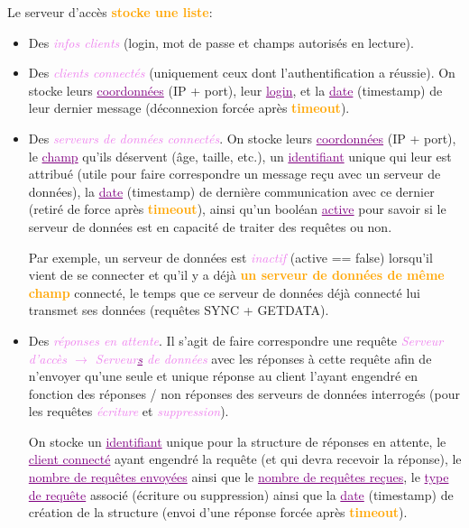 \documentclass[a4paper]{article}
\newcommand{\ra}{\rightarrow}
\let\oldtextbf\textbf
\renewcommand{\textbf}[1]{\textcolor{orange}{\oldtextbf{#1}}}
\let\oldunderline\underline{}
\renewcommand{\underline}[1]{\textcolor{purple}{\oldunderline{#1}}}
\let\oldtextit\textit
\renewcommand{\textit}[1]{\textcolor{violet}{\oldtextit{#1}}}
\begin{document}
Le serveur d'accès \textbf{stocke une liste}:
\begin{itemize}
    \item Des \textit{infos clients} (login, mot de passe et champs autorisés en lecture).

    \item Des \textit{clients connectés} (uniquement ceux dont l'authentification a réussie). On stocke leurs \underline{coordonnées} (IP + port), leur \underline{login}, et la \underline{date} (timestamp) de leur dernier message (déconnexion forcée après \textbf{timeout}).

    \item Des \textit{serveurs de données connectés}. On stocke leurs \underline{coordonnées} (IP + port), le \underline{champ} qu'ils déservent (âge, taille, etc.), un \underline{identifiant} unique qui leur est attribué (utile pour faire correspondre un message reçu avec un serveur de données), la \underline{date} (timestamp) de dernière communication avec ce dernier (retiré de force après \textbf{timeout}), ainsi qu'un booléan \underline{active} pour savoir si le serveur de données est en capacité de traiter des requêtes ou non.

    Par exemple, un serveur de données est \textit{inactif} (active == false) lorsqu'il vient de se connecter et qu'il y a déjà \textbf{un serveur de données de même champ} connecté, le temps que ce serveur de données déjà connecté lui transmet ses données (requêtes SYNC + GETDATA).

    \item Des \textit{réponses en attente}. Il s'agit de faire correspondre une requête \textit{Serveur d'accès $\ra$ Serveur\underline{s} de données} avec les réponses à cette requête afin de n'envoyer qu'une seule et unique réponse au client l'ayant engendré en fonction des réponses / non réponses des serveurs de données interrogés (pour les requêtes \textit{écriture} et \textit{suppression}).

    On stocke un \underline{identifiant} unique pour la structure de réponses en attente, le \underline{client connecté} ayant engendré la requête (et qui devra recevoir la réponse), le \underline{nombre de requêtes envoyées} ainsi que le \underline{nombre de requêtes reçues}, le \underline{type de requête} associé (écriture ou suppression) ainsi que la \underline{date} (timestamp) de création de la structure (envoi d'une réponse forcée après \textbf{timeout}).
\end{itemize}
\end{document}
